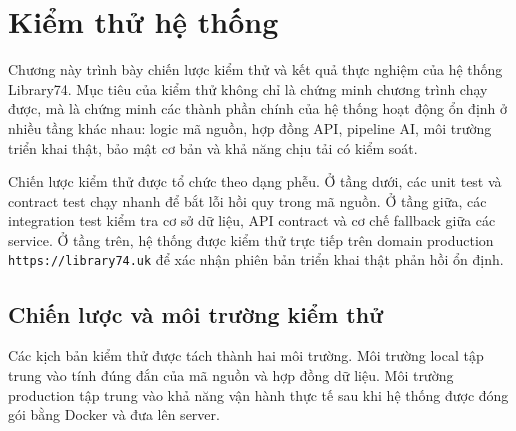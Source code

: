\chapter{Kiểm thử hệ thống}
\label{ch:testing}

Chương này trình bày chiến lược kiểm thử và kết quả thực nghiệm của hệ thống
Library74. Mục tiêu của kiểm thử không chỉ là chứng minh chương trình chạy được,
mà là chứng minh các thành phần chính của hệ thống hoạt động ổn định ở nhiều
tầng khác nhau: logic mã nguồn, hợp đồng API, pipeline AI, môi trường triển khai
thật, bảo mật cơ bản và khả năng chịu tải có kiểm soát.

Chiến lược kiểm thử được tổ chức theo dạng phễu. Ở tầng dưới, các unit test và
contract test chạy nhanh để bắt lỗi hồi quy trong mã nguồn. Ở tầng giữa, các
integration test kiểm tra cơ sở dữ liệu, API contract và cơ chế fallback giữa
các service. Ở tầng trên, hệ thống được kiểm thử trực tiếp trên domain production
\texttt{https://library74.uk} để xác nhận phiên bản triển khai thật phản hồi ổn
định.

\section{Chiến lược và môi trường kiểm thử}

Các kịch bản kiểm thử được tách thành hai môi trường. Môi trường local tập trung
vào tính đúng đắn của mã nguồn và hợp đồng dữ liệu. Môi trường production tập trung
vào khả năng vận hành thực tế sau khi hệ thống được đóng gói bằng Docker và đưa
lên server.

